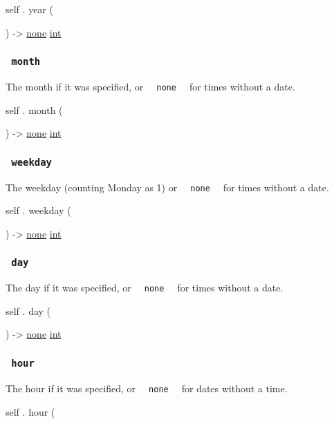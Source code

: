 self { . } { year } (

) -\textgreater{} \href{/docs/reference/foundations/none/}{none}
\href{/docs/reference/foundations/int/}{int}

\subsubsection{\texorpdfstring{\texttt{\ month\ }}{ month }}\label{definitions-month}

The month if it was specified, or
\texttt{\ }{\texttt{\ none\ }}\texttt{\ } for times without a date.

self { . } { month } (

) -\textgreater{} \href{/docs/reference/foundations/none/}{none}
\href{/docs/reference/foundations/int/}{int}

\subsubsection{\texorpdfstring{\texttt{\ weekday\ }}{ weekday }}\label{definitions-weekday}

The weekday (counting Monday as 1) or
\texttt{\ }{\texttt{\ none\ }}\texttt{\ } for times without a date.

self { . } { weekday } (

) -\textgreater{} \href{/docs/reference/foundations/none/}{none}
\href{/docs/reference/foundations/int/}{int}

\subsubsection{\texorpdfstring{\texttt{\ day\ }}{ day }}\label{definitions-day}

The day if it was specified, or
\texttt{\ }{\texttt{\ none\ }}\texttt{\ } for times without a date.

self { . } { day } (

) -\textgreater{} \href{/docs/reference/foundations/none/}{none}
\href{/docs/reference/foundations/int/}{int}

\subsubsection{\texorpdfstring{\texttt{\ hour\ }}{ hour }}\label{definitions-hour}

The hour if it was specified, or
\texttt{\ }{\texttt{\ none\ }}\texttt{\ } for dates without a time.

self { . } { hour } (

